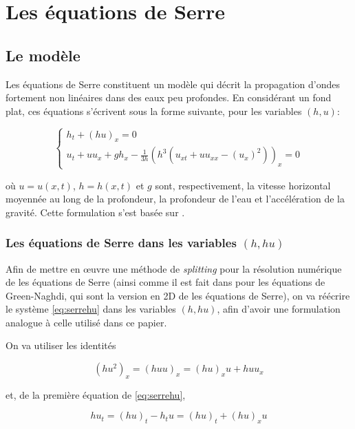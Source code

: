\section{Les équations de Serre}
\label{sec:Serre}

\subsection{Le modèle}

\indent Les équations de Serre constituent un modèle qui décrit la propagation d'ondes fortement non linéaires dans des eaux peu profondes. En considérant un fond plat, ces équations s'écrivent sous la forme suivante, pour les variables $(h,u)$:

\begin{equation}
\label{eq:serrehu}
\begin{cases}
h_t + (hu)_x = 0 \\
u_t + uu_x + gh_x - \frac{1}{3h}\left(h^3 \left( u_{xt} + uu_{xx} - (u_x)^2  \right) \right)_x = 0
\end{cases}
\end{equation}

\noindent où $u = u(x,t)$, $h = h(x,t)$ et $g$ sont, respectivement, la vitesse horizontal moyennée au long de la profondeur, la profondeur de l'eau et l'accélération de la gravité. Cette formulation s'est basée sur \cite{CarterCienfuegos2011}.

\subsubsection{Les équations de Serre dans les variables $(h,hu)$}

\indent Afin de mettre en œuvre une méthode de \emph{splitting} pour la résolution numérique de les équations de Serre (ainsi comme il est fait dans \cite{Bonneton2011} pour les équations de Green-Naghdi, qui sont la version en 2D de les équations de Serre), on va réécrire le système \eqref{eq:serrehu} dans les variables $(h,hu)$, afin d'avoir une formulation analogue à celle utilisé dans ce papier.

\indent On va utiliser les identités

\begin{equation*}
	(hu^2)_x = (huu)_x = (hu)_xu + huu_x
\end{equation*}

\noindent et, de la première équation de \eqref{eq:serrehu},

\begin{equation*}
	hu_t = (hu)_t - h_tu = (hu)_t +  (hu)_xu
\end{equation*}

